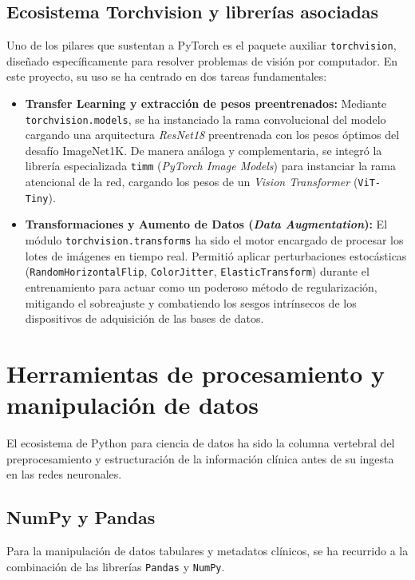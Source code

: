 \subsection{Ecosistema Torchvision y librerías asociadas}

Uno de los pilares que sustentan a PyTorch es el paquete auxiliar \texttt{torchvision}, diseñado específicamente para resolver problemas de visión por computador. En este proyecto, su uso se ha centrado en dos tareas fundamentales:

\begin{itemize}
	\item \textbf{Transfer Learning y extracción de pesos preentrenados:} Mediante \texttt{torchvision.models}, se ha instanciado la rama convolucional del modelo cargando una arquitectura \textit{ResNet18} preentrenada con los pesos óptimos del desafío ImageNet1K. De manera análoga y complementaria, se integró la librería especializada \texttt{timm} (\textit{PyTorch Image Models}) para instanciar la rama atencional de la red, cargando los pesos de un \textit{Vision Transformer} (\texttt{ViT-Tiny}).
	
	\item \textbf{Transformaciones y Aumento de Datos (\textit{Data Augmentation}):} El módulo \texttt{torchvision.transforms} ha sido el motor encargado de procesar los lotes de imágenes en tiempo real. Permitió aplicar perturbaciones estocásticas (\texttt{RandomHorizontalFlip}, \texttt{ColorJitter}, \texttt{ElasticTransform}) durante el entrenamiento para actuar como un poderoso método de regularización, mitigando el sobreajuste y combatiendo los sesgos intrínsecos de los dispositivos de adquisición de las bases de datos.
\end{itemize}

\section{Herramientas de procesamiento y manipulación de datos}

El ecosistema de Python para ciencia de datos ha sido la columna vertebral del preprocesamiento y estructuración de la información clínica antes de su ingesta en las redes neuronales.

\subsection{NumPy y Pandas}

Para la manipulación de datos tabulares y metadatos clínicos, se ha recurrido a la combinación de las librerías \texttt{Pandas} y \texttt{NumPy}. 

